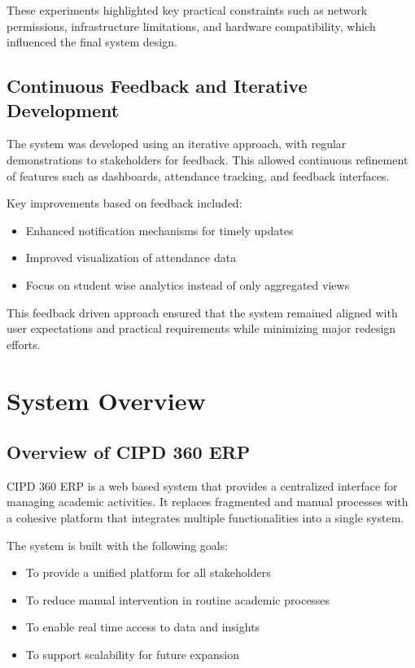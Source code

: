 These experiments highlighted key practical constraints such as network permissions, infrastructure
limitations, and hardware compatibility, which influenced the final system design.

\section{Continuous Feedback and Iterative Development}

The system was developed using an iterative approach, with regular demonstrations to stakeholders
for feedback. This allowed continuous refinement of features such as dashboards, attendance
tracking, and feedback interfaces.

Key improvements based on feedback included:

\begin{itemize}
    \item Enhanced notification mechanisms for timely updates
    \item Improved visualization of attendance data
    \item Focus on student wise analytics instead of only aggregated views
\end{itemize}

This feedback driven approach ensured that the system remained aligned with user expectations and
practical requirements while minimizing major redesign efforts.

\chapter{System Overview}{\label{ch:sysoverview}}

\section{Overview of CIPD 360 ERP}

CIPD 360 ERP is a web based system that provides a centralized interface for managing academic
activities. It replaces fragmented and manual processes with a cohesive platform that integrates
multiple functionalities into a single system.

The system is built with the following goals:

\begin{itemize}
    \item To provide a unified platform for all stakeholders
    \item To reduce manual intervention in routine academic processes
    \item To enable real time access to data and insights
    \item To support scalability for future expansion
\end{itemize}

